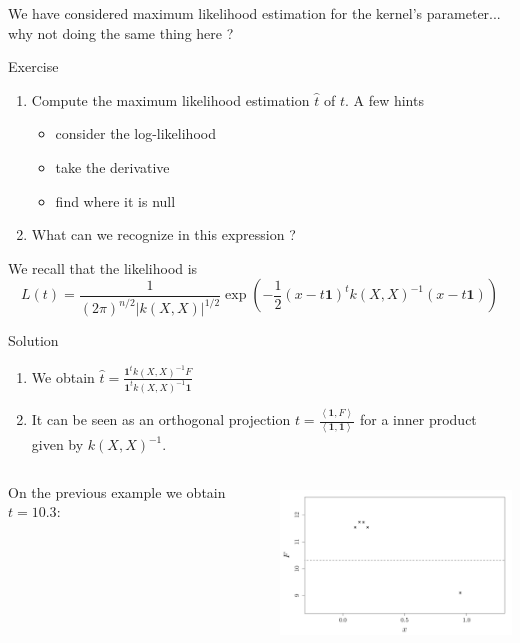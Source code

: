 \documentclass{beamer}
\newcommand\PSi[2]{{ \left \langle #1 \right \rangle}_{\! #2}}
\begin{document}
\begin{frame}{}
We have considered maximum likelihood estimation for the kernel's parameter... why not doing the same thing here ?
\begin{exampleblock}{Exercise}
\begin{enumerate}
	\item Compute the maximum likelihood estimation $\hat{t}$ of $t$. A few hints
	\begin{itemize}
		\item consider the log-likelihood
		\item take the derivative
		\item find where it is null
	\end{itemize}
	\item What can we recognize in this expression ?
\end{enumerate}
We recall that the likelihood is
\begin{equation*}
L(t) = \frac{1}{\displaystyle (2 \pi)^{n/2} |k(X,X)|^{1/2}} \exp \left(-\frac12 (x-t \mathbf{1})^t k(X,X)^{-1} (x-t \mathbf{1})  \right)
\end{equation*}
\end{exampleblock}
\end{frame}

\begin{frame}{}
\begin{exampleblock}{Solution}
\begin{enumerate}
	\item We obtain $ \displaystyle \hat{t} = \frac{\mathbf{1}^t k(X,X)^{-1} F}{\mathbf{1}^t k(X,X)^{-1} \mathbf{1}}$ 
	\item It can be seen as an orthogonal projection $ \displaystyle t = \frac{\PSi{\mathbf{1}, F}{}}{\PSi{\mathbf{1},\mathbf{1}}{}}$ for a inner product given by 
	$k(X,X)^{-1}$. 
\end{enumerate}
\end{exampleblock}
\begin{columns}[c]
\begin{column}{4cm}
On the previous example we obtain $t=10.3$:
\end{column}
\begin{column}{6cm}
\hspace{-8mm} \includegraphics[height=4.2cm]{figures/R/trend_estimordinary}
\end{column}
\end{columns}
\end{frame}
\end{document}
